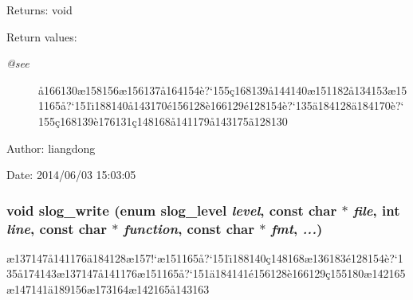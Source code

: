\begin{Desc}
\item[Returns:]void \end{Desc}
\begin{Desc}
\item[Return values:]
\begin{description}
\item[{\em @see}]\aa{}166130\ae{}158156\ae{}156137\aa{}164154\`{e}?`155\c{c}168139\aa{}144140\ae{}151182\aa{}134153\ae{}151165\aa{}?`151\"{\i}188140\aa{}143170\'{e}156128\`{e}166129\'{e}128154\`{e}?`135\"{a}184128\"{a}184170\`{e}?`155\c{c}168139\`{e}176131\c{c}148168\aa{}141179\aa{}143175\~{a}128130 \end{description}
\end{Desc}
\begin{Desc}
\item[Author:]liangdong \end{Desc}
\begin{Desc}
\item[Date:]2014/06/03 15:03:05 \end{Desc}
\subsubsection{\setlength{\rightskip}{0pt plus 5cm}void slog\_\-write (enum slog\_\-level {\em level}, const char $\ast$ {\em file}, int {\em line}, const char $\ast$ {\em function}, const char $\ast$ {\em fmt},  {\em ...})}\label{slog_8h_a11}


\ae{}137147\aa{}141176\"{a}184128\ae{}157!`\ae{}151165\aa{}?`151\"{\i}188140\c{c}148168\ae{}136183\'{e}128154\`{e}?`135\aa{}174143\ae{}137147\aa{}141176\ae{}151165\aa{}?`151\"{a}184141\'{e}156128\`{e}166129\c{c}155180\ae{}142165\ae{}147141\"{a}189156\ae{}173164\ae{}142165\aa{}143163 

